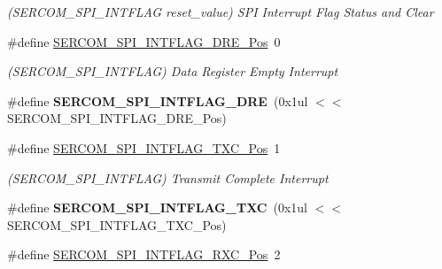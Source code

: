 \begin{DoxyCompactItemize}
\begin{DoxyCompactList}\small\item\em (S\+E\+R\+C\+O\+M\+\_\+\+S\+P\+I\+\_\+\+I\+N\+T\+F\+L\+A\+G reset\+\_\+value) S\+P\+I Interrupt Flag Status and Clear \end{DoxyCompactList}\item 
\hypertarget{group___s_a_m_l21___s_e_r_c_o_m_ga3fa72ba1f396c43ca489e2d4ae9f330f}{}\#define \hyperlink{group___s_a_m_l21___s_e_r_c_o_m_ga3fa72ba1f396c43ca489e2d4ae9f330f}{S\+E\+R\+C\+O\+M\+\_\+\+S\+P\+I\+\_\+\+I\+N\+T\+F\+L\+A\+G\+\_\+\+D\+R\+E\+\_\+\+Pos}~0\label{group___s_a_m_l21___s_e_r_c_o_m_ga3fa72ba1f396c43ca489e2d4ae9f330f}

\begin{DoxyCompactList}\small\item\em (S\+E\+R\+C\+O\+M\+\_\+\+S\+P\+I\+\_\+\+I\+N\+T\+F\+L\+A\+G) Data Register Empty Interrupt \end{DoxyCompactList}\item 
\hypertarget{group___s_a_m_l21___s_e_r_c_o_m_ga6b1f883e57d8906b303a2804b94caff6}{}\#define {\bfseries S\+E\+R\+C\+O\+M\+\_\+\+S\+P\+I\+\_\+\+I\+N\+T\+F\+L\+A\+G\+\_\+\+D\+R\+E}~(0x1ul $<$$<$ S\+E\+R\+C\+O\+M\+\_\+\+S\+P\+I\+\_\+\+I\+N\+T\+F\+L\+A\+G\+\_\+\+D\+R\+E\+\_\+\+Pos)\label{group___s_a_m_l21___s_e_r_c_o_m_ga6b1f883e57d8906b303a2804b94caff6}

\item 
\hypertarget{group___s_a_m_l21___s_e_r_c_o_m_gad62e87594775d6fa2eaa19b613d09101}{}\#define \hyperlink{group___s_a_m_l21___s_e_r_c_o_m_gad62e87594775d6fa2eaa19b613d09101}{S\+E\+R\+C\+O\+M\+\_\+\+S\+P\+I\+\_\+\+I\+N\+T\+F\+L\+A\+G\+\_\+\+T\+X\+C\+\_\+\+Pos}~1\label{group___s_a_m_l21___s_e_r_c_o_m_gad62e87594775d6fa2eaa19b613d09101}

\begin{DoxyCompactList}\small\item\em (S\+E\+R\+C\+O\+M\+\_\+\+S\+P\+I\+\_\+\+I\+N\+T\+F\+L\+A\+G) Transmit Complete Interrupt \end{DoxyCompactList}\item 
\hypertarget{group___s_a_m_l21___s_e_r_c_o_m_ga0be91a7b9fb7ea4d40a2097dc722fb35}{}\#define {\bfseries S\+E\+R\+C\+O\+M\+\_\+\+S\+P\+I\+\_\+\+I\+N\+T\+F\+L\+A\+G\+\_\+\+T\+X\+C}~(0x1ul $<$$<$ S\+E\+R\+C\+O\+M\+\_\+\+S\+P\+I\+\_\+\+I\+N\+T\+F\+L\+A\+G\+\_\+\+T\+X\+C\+\_\+\+Pos)\label{group___s_a_m_l21___s_e_r_c_o_m_ga0be91a7b9fb7ea4d40a2097dc722fb35}

\item 
\hypertarget{group___s_a_m_l21___s_e_r_c_o_m_gabec68eb91f1f30d42c26f6ee6f24cdde}{}\#define \hyperlink{group___s_a_m_l21___s_e_r_c_o_m_gabec68eb91f1f30d42c26f6ee6f24cdde}{S\+E\+R\+C\+O\+M\+\_\+\+S\+P\+I\+\_\+\+I\+N\+T\+F\+L\+A\+G\+\_\+\+R\+X\+C\+\_\+\+Pos}~2\label{group___s_a_m_l21___s_e_r_c_o_m_gabec68eb91f1f30d42c26f6ee6f24cdde}


\end{DoxyCompactItemize}
